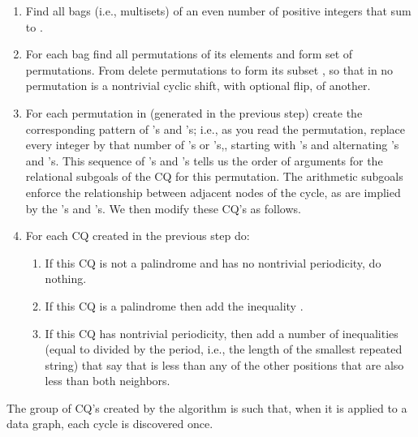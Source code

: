 \begin{enumerate}

\item Find all bags (i.e., multisets) of an even number of positive integers that sum to .

\item
For each bag find all permutations of its elements
and form set  of permutations. From  delete permutations to form its subset , so that in  no permutation is a nontrivial cyclic shift, with optional flip, of another.

\item
For each permutation in   (generated in the previous
step) create the corresponding pattern of 's and 's; i.e., as you read the permutation, replace every integer by that number of 's or 's,, starting with 's and alternating 's and 's.
This sequence of 's and 's tells us the order of arguments for the relational subgoals of the CQ for this permutation.  The arithmetic subgoals enforce the relationship between adjacent nodes of the cycle, as are implied by the 's and 's.  We then modify these CQ's as follows.

\item
For each CQ created in the previous step do:

\begin{enumerate}

\item If this CQ is not a palindrome and has no nontrivial periodicity, do nothing.

\item If this CQ is a palindrome then add the inequality .

\item If this CQ has nontrivial periodicity, then add a number of inequalities
(equal to  divided by the period, i.e., the length of the
smallest repeated string) that say that
 is less than any of the other positions that are also less than
both neighbors.

\end{enumerate}
\end{enumerate}



\begin{theorem}
\label{auto-once-thm}
The group of CQ's created by the algorithm is such that, when it is applied to a data graph, each cycle is discovered once.
\end{theorem}

